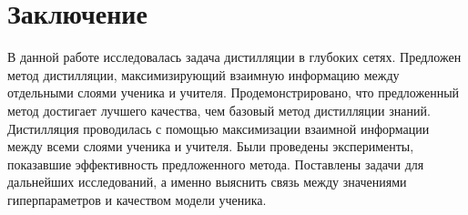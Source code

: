 \section{Заключение}

В данной работе исследовалась задача дистилляции в глубоких сетях.
Предложен метод дистилляции, максимизирующий взаимную информацию между отдельными слоями ученика и учителя.
Продемонстрировано, что предложенный метод достигает лучшего качества, чем базовый метод дистилляции знаний.
Дистилляция проводилась с помощью максимизации взаимной информации между всеми слоями ученика и учителя.
Были проведены эксперименты, показавшие эффективность предложенного метода.
Поставлены задачи для дальнейших исследований, а именно выяснить связь между значениями гиперпараметров и качеством модели ученика.
